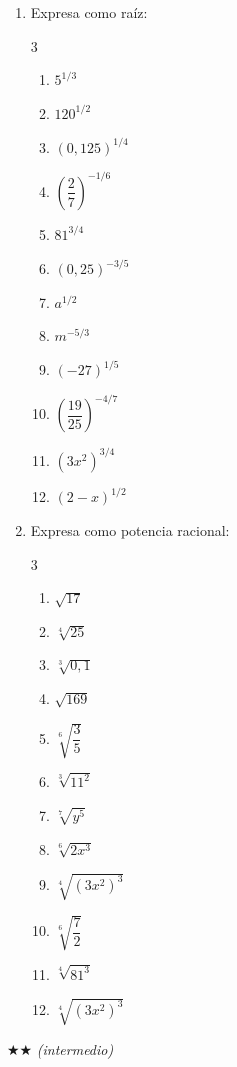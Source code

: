 \documentclass[11pt, letterpaper]{article}
\begin{document}
\begin{enumerate}[label=\textbf{\arabic*.}, leftmargin=*]
  \item Expresa como raíz:
  \begin{multicols}{3}
  \begin{enumerate}[label=\alph*)]
    \item $5^{1/3}$
    \item $120^{1/2}$
    \item $(0{,}125)^{1/4}$
    \item $\left(\dfrac{2}{7}\right)^{-1/6}$
    \item $81^{3/4}$
    \item $(0{,}25)^{-3/5}$
    \item $a^{1/2}$
    \item $m^{-5/3}$
    \item $(-27)^{1/5}$
    \item $\left(\dfrac{19}{25}\right)^{-4/7}$
    \item $(3x^2)^{3/4}$
    \item $(2-x)^{1/2}$
  \end{enumerate}
  \end{multicols}

  \item Expresa como potencia racional:
  \begin{multicols}{3}
  \begin{enumerate}[label=\alph*)]
    \item $\sqrt{17}$
    \item $\sqrt[4]{25}$
    \item $\sqrt[3]{0{,}1}$
    \item $\sqrt{169}$
    \item $\sqrt[6]{\dfrac{3}{5}}$
    \item $\sqrt[3]{11^2}$
    \item $\sqrt[7]{y^5}$
    \item $\sqrt[6]{2x^3}$
    \item $\sqrt[4]{(3x^2)^3}$
    \item $\sqrt[6]{\dfrac{7}{2}}$
    \item $\sqrt[4]{81^3}$
    \item $\sqrt[4]{(3x^2)^3}$
  \end{enumerate}
  \end{multicols}
\end{enumerate}

$\bigstar\bigstar$ \textit{(intermedio)}
\end{document}
